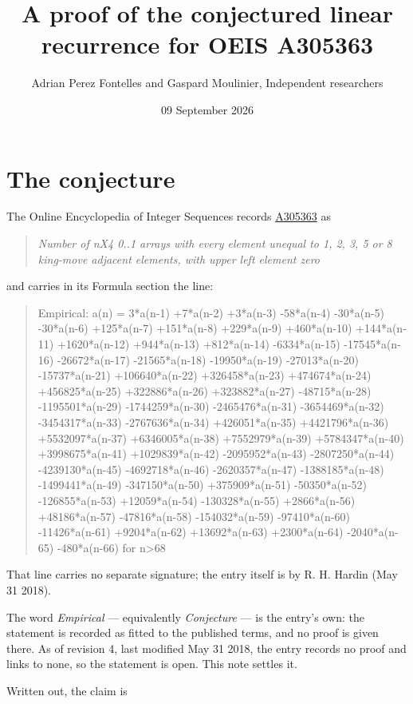 \documentclass[11pt]{article}
\title{A proof of the conjectured linear recurrence for OEIS A305363}
\author{Adrian Perez Fontelles and Gaspard Moulinier, Independent researchers}
\date{09 September 2026}
\theoremstyle{definition}
\begin{document}
\maketitle
\section{The conjecture}

The Online Encyclopedia of Integer Sequences records \href{https://oeis.org/A305363}{A305363} as

\begin{quote}\itshape Number of nX4 0..1 arrays with every element unequal to 1, 2, 3, 5 or 8 king-move adjacent elements, with upper left element zero\end{quote}

and carries in its Formula section the line:

\begin{quote}\ttfamily Empirical: a(n) = 3*a(n-1) +7*a(n-2) +3*a(n-3) -58*a(n-4) -30*a(n-5) -30*a(n-6) +125*a(n-7) +151*a(n-8) +229*a(n-9) +460*a(n-10) +144*a(n-11) +1620*a(n-12) +944*a(n-13) +812*a(n-14) -6334*a(n-15) -17545*a(n-16) -26672*a(n-17) -21565*a(n-18) -19950*a(n-19) -27013*a(n-20) -15737*a(n-21) +106640*a(n-22) +326458*a(n-23) +474674*a(n-24) +456825*a(n-25) +322886*a(n-26) +323882*a(n-27) -48715*a(n-28) -1195501*a(n-29) -1744259*a(n-30) -2465476*a(n-31) -3654469*a(n-32) -3454317*a(n-33) -2767636*a(n-34) +426051*a(n-35) +4421796*a(n-36) +5532097*a(n-37) +6346005*a(n-38) +7552979*a(n-39) +5784347*a(n-40) +3998675*a(n-41) +1029839*a(n-42) -2095952*a(n-43) -2807250*a(n-44) -4239130*a(n-45) -4692718*a(n-46) -2620357*a(n-47) -1388185*a(n-48) -1499441*a(n-49) -347150*a(n-50) +375909*a(n-51) -50350*a(n-52) -126855*a(n-53) +12059*a(n-54) -130328*a(n-55) +2866*a(n-56) +48186*a(n-57) -47816*a(n-58) -154032*a(n-59) -97410*a(n-60) -11426*a(n-61) +9204*a(n-62) +13692*a(n-63) +2300*a(n-64) -2040*a(n-65) -480*a(n-66) for n>68\end{quote}

That line carries no separate signature; the entry itself is by R. H. Hardin (May 31 2018).

The word {\itshape Empirical} --- equivalently {\itshape Conjecture} --- is the entry's own: the statement is recorded as fitted to the published terms, and no proof is given there. As of revision 4, last modified May 31 2018, the entry records no proof and links to none, so the statement is open. This note settles it.

Written out, the claim is
\end{document}

